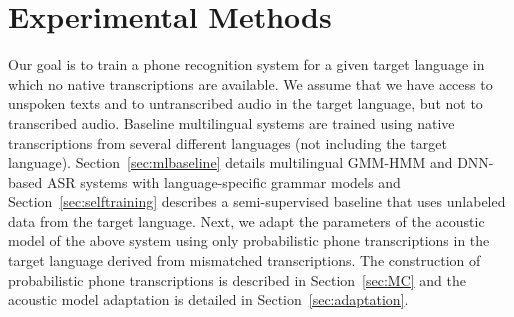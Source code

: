 \section{Experimental Methods}
\label{sec:methods}

Our goal is to train a phone recognition system for a given target language in which no native transcriptions are available. We assume that we have access to unspoken texts and to untranscribed audio in the target language, but not to transcribed audio.
Baseline multilingual systems are trained using native transcriptions from several different languages (not including the target language). Section~\ref{sec:mlbaseline} details multilingual GMM-HMM and DNN-based ASR systems with language-specific grammar models and Section~\ref{sec:selftraining} describes a semi-supervised baseline that uses unlabeled data from the target language.
Next, we adapt the parameters of the acoustic model of the above system using only probabilistic phone transcriptions in the target language derived from mismatched transcriptions. The construction of probabilistic phone transcriptions is described in Section~\ref{sec:MC} and the acoustic model adaptation is detailed in Section~\ref{sec:adaptation}.
